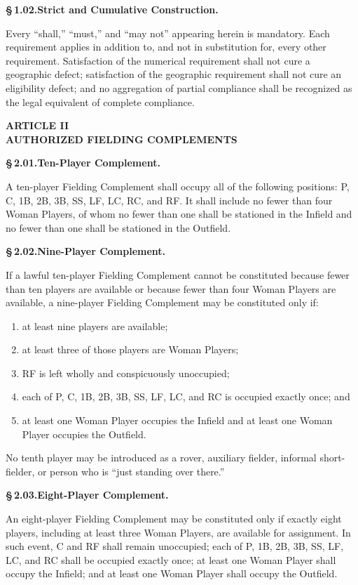 \documentclass[11pt]{article}
\newcommand{\articleheading}[1]{%
  \vspace{6pt}
  \begin{center}
    \large\bfseries #1
  \end{center}
  \vspace{-3pt}
}
\newcommand{\sectionheading}[2]{%
  \vspace{4pt}
  \noindent\textbf{\S\,#1.\quad #2}\par
}
\begin{document}
\sectionheading{1.02}{Strict and Cumulative Construction.}
Every ``shall,'' ``must,'' and ``may not'' appearing herein is mandatory.
Each requirement applies in addition to, and not in substitution for, every
other requirement. Satisfaction of the numerical requirement shall not cure a
geographic defect; satisfaction of the geographic requirement shall not cure
an eligibility defect; and no aggregation of partial compliance shall be
recognized as the legal equivalent of complete compliance.

\articleheading{ARTICLE II\\AUTHORIZED FIELDING COMPLEMENTS}

\sectionheading{2.01}{Ten-Player Complement.}
A ten-player Fielding Complement shall occupy all of the following positions:
P, C, 1B, 2B, 3B, SS, LF, LC, RC, and RF. It shall include no fewer than four
Woman Players, of whom no fewer than one shall be stationed in the Infield and
no fewer than one shall be stationed in the Outfield.

\sectionheading{2.02}{Nine-Player Complement.}
If a lawful ten-player Fielding Complement cannot be constituted because
fewer than ten players are available or because fewer than four Woman Players
are available, a nine-player Fielding Complement may be constituted only if:
\begin{enumerate}[label=(\roman*)]
  \item at least nine players are available;
  \item at least three of those players are Woman Players;
  \item RF is left wholly and conspicuously unoccupied;
  \item each of P, C, 1B, 2B, 3B, SS, LF, LC, and RC is occupied exactly once;
  and
  \item at least one Woman Player occupies the Infield and at least one Woman
  Player occupies the Outfield.
\end{enumerate}
No tenth player may be introduced as a rover, auxiliary fielder, informal
short-fielder, or person who is ``just standing over there.''

\sectionheading{2.03}{Eight-Player Complement.}
An eight-player Fielding Complement may be constituted only if exactly eight
players, including at least three Woman Players, are available for assignment.
In such event, C and RF shall remain unoccupied; each of P, 1B, 2B, 3B, SS,
LF, LC, and RC shall be occupied exactly once; at least one Woman Player shall
occupy the Infield; and at least one Woman Player shall occupy the Outfield.
\end{document}
